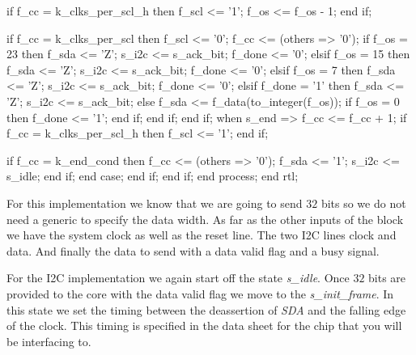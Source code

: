 \begin{VHDLlisting}[tabsize=4]
                        if f_cc = k_clks_per_scl_h then
                            f_scl <= '1';
                            f_os <= f_os - 1;
                        end if; 
						
                        if f_cc = k_clks_per_scl then
                            f_scl <= '0';
                            f_cc <= (others => '0');
                            if f_os = 23 then
                                f_sda <= 'Z';
                                s_i2c <= s_ack_bit;
                                f_done <= '0';
                            elsif f_os = 15 then
                                f_sda <= 'Z';
                                s_i2c <= s_ack_bit;
                                f_done <= '0';
                            elsif f_os = 7 then
                                f_sda <= 'Z';
                                s_i2c <= s_ack_bit;
                                f_done <= '0';
                            elsif f_done = '1' then
                                f_sda <= 'Z';
                                s_i2c <= s_ack_bit;
                            else
                                f_sda <= f_data(to_integer(f_os));
                                if f_os = 0 then
                                    f_done <= '1';
                                end if;
                            end if;
                        end if;
                    when s_end =>
                        f_cc <= f_cc + 1;
                        if f_cc = k_clks_per_scl_h then
                            f_scl <= '1';
                        end if; 
						
                        if f_cc = k_end_cond then
                            f_cc <= (others => '0');
                            f_sda <= '1';
                            s_i2c <= s_idle;
                        end if;
                end case;
            end if;
        end if;
    end process;
end rtl;
\end{VHDLlisting}

For this implementation we know that we are going to send $32$ bits so we do not need a generic to specify the data width. As far as the other inputs of the block we have the system clock as well as the reset line. The two \ac{I2C} lines clock and data. And finally the data to send with a data valid flag and a busy signal. 

For the \ac{I2C} implementation we again start off the state \emph{s\_idle}. Once $32$ bits are provided to the core with the data valid flag we move to the \emph{s\_init\_frame}. In this state we set the timing between the deassertion of \emph{SDA} and the falling edge of the clock. This timing is specified in the data sheet for the chip that you will be interfacing to. 

